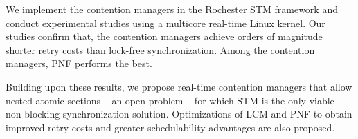 We implement the contention managers in the Rochester STM framework and conduct experimental studies using a multicore real-time Linux kernel. Our studies confirm that, the contention managers achieve orders of magnitude shorter retry costs than lock-free synchronization. Among the contention managers, PNF performs the best.

Building upon these results, we propose real-time contention managers that allow nested atomic sections -- an open problem -- for which STM is the only viable non-blocking synchronization solution. Optimizations of LCM and PNF to obtain improved retry costs and greater schedulability advantages are also proposed. 